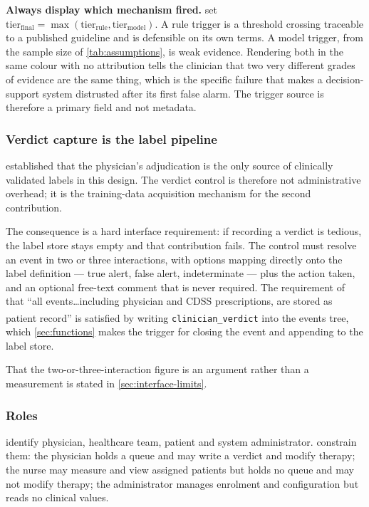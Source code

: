 \documentclass[12pt,a4paper,oneside]{report}
\newcommand{\bq}[1]{``#1''\textsuperscript{\dag}}
\begin{document}
\textbf{Always display which mechanism fired.}  set $\text{tier}_{\text{final}} = \max(\text{tier}_{\text{rule}}, \text{tier}_{\text{model}})$. A rule trigger is a threshold crossing traceable to a published guideline and is defensible on its own terms. A model trigger, from the sample size of \cref{tab:assumptions}, is weak evidence. Rendering both in the same colour with no attribution tells the clinician that two very different grades of evidence are the same thing, which is the specific failure that makes a decision-support system distrusted after its first false alarm. The trigger source is therefore a primary field and not metadata.

\subsubsection{Verdict capture is the label pipeline}\label{sec:verdict-capture}

 established that the physician's adjudication is the only source of clinically validated labels in this design. The verdict control is therefore not administrative overhead; it is the training-data acquisition mechanism for the second contribution.

The consequence is a hard interface requirement: if recording a verdict is tedious, the label store stays empty and that contribution fails. The control must resolve an event in two or three interactions, with options mapping directly onto the label definition --- true alert, false alert, indeterminate --- plus the action taken, and an optional free-text comment that is never required. The requirement of \textcite{yazdani2018} that \bq{all events\ldots including physician and CDSS prescriptions, are stored as patient record} is satisfied by writing \texttt{clinician\_verdict} into the events tree, which \cref{sec:functions} makes the trigger for closing the event and appending to the label store.

That the two-or-three-interaction figure is an argument rather than a measurement is stated in \cref{sec:interface-limits}.

\subsubsection{Roles}\label{sec:dash-roles}

\Textcite{yazdani2018} identify physician, healthcare team, patient and system administrator.  constrain them: the physician holds a queue and may write a verdict and modify therapy; the nurse may measure and view assigned patients but holds no queue and may not modify therapy; the administrator manages enrolment and configuration but reads no clinical values.
\end{document}
